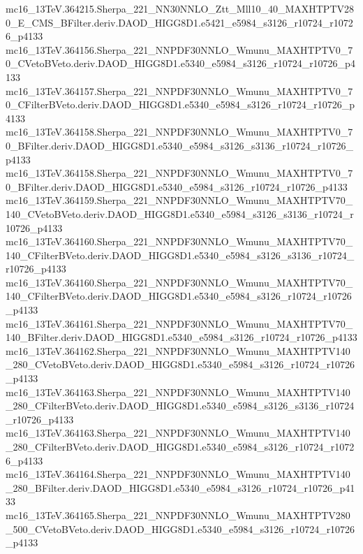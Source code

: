 \begin{footnotesize}
mc16\_13TeV.364215.Sherpa\_221\_NN30NNLO\_Ztt\_Mll10\_40\_MAXHTPTV280\_E\_CMS\_BFilter.deriv.DAOD\_HIGG8D1.e5421\_e5984\_s3126\_r10724\_r10726\_p4133 \\
mc16\_13TeV.364156.Sherpa\_221\_NNPDF30NNLO\_Wmunu\_MAXHTPTV0\_70\_CVetoBVeto.deriv.DAOD\_HIGG8D1.e5340\_e5984\_s3126\_r10724\_r10726\_p4133 \\
mc16\_13TeV.364157.Sherpa\_221\_NNPDF30NNLO\_Wmunu\_MAXHTPTV0\_70\_CFilterBVeto.deriv.DAOD\_HIGG8D1.e5340\_e5984\_s3126\_r10724\_r10726\_p4133 \\
mc16\_13TeV.364158.Sherpa\_221\_NNPDF30NNLO\_Wmunu\_MAXHTPTV0\_70\_BFilter.deriv.DAOD\_HIGG8D1.e5340\_e5984\_s3126\_s3136\_r10724\_r10726\_p4133 \\
mc16\_13TeV.364158.Sherpa\_221\_NNPDF30NNLO\_Wmunu\_MAXHTPTV0\_70\_BFilter.deriv.DAOD\_HIGG8D1.e5340\_e5984\_s3126\_r10724\_r10726\_p4133 \\
mc16\_13TeV.364159.Sherpa\_221\_NNPDF30NNLO\_Wmunu\_MAXHTPTV70\_140\_CVetoBVeto.deriv.DAOD\_HIGG8D1.e5340\_e5984\_s3126\_s3136\_r10724\_r10726\_p4133 \\
mc16\_13TeV.364160.Sherpa\_221\_NNPDF30NNLO\_Wmunu\_MAXHTPTV70\_140\_CFilterBVeto.deriv.DAOD\_HIGG8D1.e5340\_e5984\_s3126\_s3136\_r10724\_r10726\_p4133 \\
mc16\_13TeV.364160.Sherpa\_221\_NNPDF30NNLO\_Wmunu\_MAXHTPTV70\_140\_CFilterBVeto.deriv.DAOD\_HIGG8D1.e5340\_e5984\_s3126\_r10724\_r10726\_p4133 \\
mc16\_13TeV.364161.Sherpa\_221\_NNPDF30NNLO\_Wmunu\_MAXHTPTV70\_140\_BFilter.deriv.DAOD\_HIGG8D1.e5340\_e5984\_s3126\_r10724\_r10726\_p4133 \\
mc16\_13TeV.364162.Sherpa\_221\_NNPDF30NNLO\_Wmunu\_MAXHTPTV140\_280\_CVetoBVeto.deriv.DAOD\_HIGG8D1.e5340\_e5984\_s3126\_r10724\_r10726\_p4133 \\
mc16\_13TeV.364163.Sherpa\_221\_NNPDF30NNLO\_Wmunu\_MAXHTPTV140\_280\_CFilterBVeto.deriv.DAOD\_HIGG8D1.e5340\_e5984\_s3126\_s3136\_r10724\_r10726\_p4133 \\
mc16\_13TeV.364163.Sherpa\_221\_NNPDF30NNLO\_Wmunu\_MAXHTPTV140\_280\_CFilterBVeto.deriv.DAOD\_HIGG8D1.e5340\_e5984\_s3126\_r10724\_r10726\_p4133 \\
mc16\_13TeV.364164.Sherpa\_221\_NNPDF30NNLO\_Wmunu\_MAXHTPTV140\_280\_BFilter.deriv.DAOD\_HIGG8D1.e5340\_e5984\_s3126\_r10724\_r10726\_p4133 \\
mc16\_13TeV.364165.Sherpa\_221\_NNPDF30NNLO\_Wmunu\_MAXHTPTV280\_500\_CVetoBVeto.deriv.DAOD\_HIGG8D1.e5340\_e5984\_s3126\_r10724\_r10726\_p4133 \\

\end{footnotesize}
